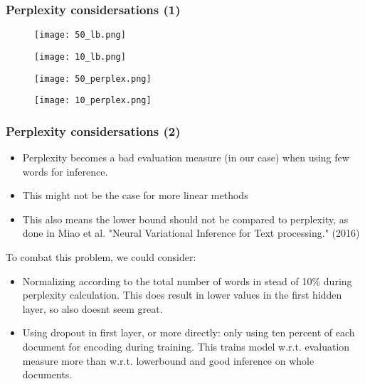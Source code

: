 \documentclass{beamer}
\begin{document}
\begin{frame}
\frametitle{Perplexity considersations (1)}
\begin{figure}[!tbp]
  \centering
  \begin{minipage}[b]{0.4\textwidth}
    \texttt{[image: 50\_lb.png]}
  \end{minipage}
  \hfill
  \begin{minipage}[b]{0.4\textwidth}
    \texttt{[image: 10\_lb.png]}
  \end{minipage}
\end{figure}
\begin{figure}[!tbp]
  \centering
  \begin{minipage}[b]{0.4\textwidth}
    \texttt{[image: 50\_perplex.png]}
  \end{minipage}
  \hfill
  \begin{minipage}[b]{0.4\textwidth}
    \texttt{[image: 10\_perplex.png]}
  \end{minipage}
\end{figure}
\end{frame}


\begin{frame}
\frametitle{Perplexity considersations (2)}
\begin{itemize}
\item{Perplexity becomes a bad evaluation measure (in our case) when using few words for inference.}
\item{This might not be the case for more linear methods}
\item{This also means the lower bound should not be compared to perplexity, as done in Miao et al. "Neural Variational Inference for Text processing." (2016)}
\end{itemize}
To combat this problem, we could consider:
\begin{itemize}
\item{Normalizing according to the total number of words in stead of 10\% during perplexity calculation. This does result in lower values in the first hidden layer, so also doesnt seem great.}
\item{Using dropout in first layer, or more directly: only using ten percent of each document for encoding during training. This trains model w.r.t. evaluation measure more than w.r.t. lowerbound and good inference on whole documents.}
\end{itemize}
\end{frame}
\end{document}
